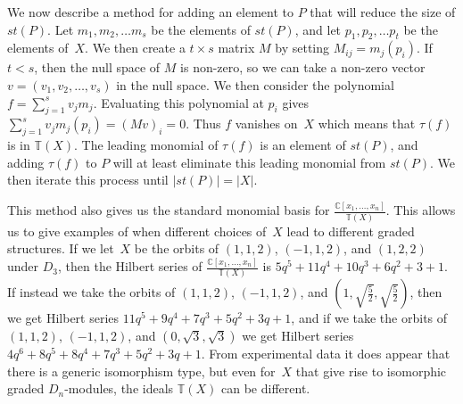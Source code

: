 \documentclass[ALCO,ThmDefs,Unicode,epreuves]{cedram}
\begin{document}
We now describe a method for adding an element to $P$ that will reduce the size of $st(P)$. Let $m_1,m_2,\ldots m_s$ be the 
elements of $st(P)$, and let $p_1,p_2,\ldots p_t$ be the elements of~$X$. We then create a $t\times s$ matrix $M$ by setting 
$M_{ij}=m_j(p_i)$. If $t<s$, then the null space of $M$ is non-zero, so we can take a non-zero vector $v=(v_1,v_2,\ldots, 
v_s)$ in the null space. We then consider the polynomial $f=\sum_{j=1}^s v_jm_j$. Evaluating this polynomial at $p_i$ gives 
$\sum_{j=1}^s v_jm_j(p_i)=(Mv)_i=0$. Thus $f$ vanishes on~$X$ which means that $\tau (f)$ is in $\mathbb{T}(X)$. The leading 
monomial of $\tau (f)$ is an element of $st(P)$, and adding $\tau (f)$ to $P$ will at least eliminate this leading monomial 
from $st(P)$. We then iterate this process until $\vert st(P)\vert =\vert X\vert$.


This method also gives us the standard monomial basis for $\frac{\mathbb{C}[x_1,\ldots, x_n]}{\mathbb{T}(X)}$. This allows us 
to give examples of when different choices of~$X$ lead to different graded structures. If we let~$X$ be the orbits of 
$(1,1,2)$, $(-1,1,2)$, and $(1,2,2)$ under $D_3$, then the Hilbert series of $\frac{\mathbb{C}[x_1,\ldots, 
x_n]}{\mathbb{T}(X)}$ is $5q^5+11q^4+10q^3+6q^2+3+1$. If instead we take the orbits of $(1,1,2)$, $(-1,1,2)$, and 
$(1,\sqrt{\frac{5}{2}},\sqrt{\frac{5}{2}})$, then we get Hilbert series $11q^5+9q^4+7q^3+5q^2+3q+1$, and if we take the orbits 
of $(1,1,2)$, $(-1,1,2)$, and $(0,\sqrt{3},\sqrt{3})$ we get Hilbert series $4q^6+8q^5+8q^4+7q^3+5q^2+3q+1$. From experimental 
data it does appear that there is a generic isomorphism type, but even for~$X$ that give rise to isomorphic graded 
$D_n$-modules, the ideals $\mathbb{T}(X)$ can be different.


 




\nocite{*}


\end{document}
